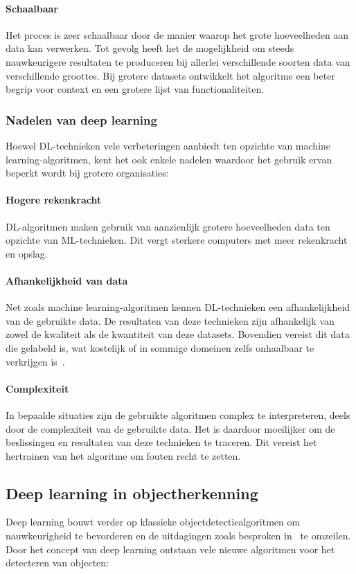 \paragraph{Schaalbaar}
Het proces is zeer schaalbaar door de manier waarop het grote hoeveelheden aan data kan verwerken.
Tot gevolg heeft het de mogelijkheid om steeds nauwkeurigere resultaten te produceren bij allerlei verschillende soorten data van verschillende groottes.
Bij grotere datasets ontwikkelt het algoritme een beter begrip voor context en een grotere lijst van functionaliteiten.

\subsubsection{Nadelen van deep learning}
Hoewel DL-technieken vele verbeteringen aanbiedt ten opzichte van machine learning-algoritmen, kent het ook enkele nadelen waardoor het gebruik ervan beperkt wordt bij grotere organisaties:

\paragraph{Hogere rekenkracht}
DL-algoritmen maken gebruik van aanzienlijk grotere hoeveelheden data ten opzichte van ML-technieken.
Dit vergt sterkere computers met meer rekenkracht en opslag.
\paragraph{Afhankelijkheid van data}
Net zoals machine learning-algoritmen kennen DL-technieken een afhankelijkheid van de gebruikte data.
De resultaten van deze technieken zijn afhankelijk van zowel de kwaliteit als de kwantiteit van deze datasets.
Bovendien vereist dit data die gelabeld is, wat kostelijk of in sommige domeinen zelfs onhaalbaar te verkrijgen is~\autocite{Olaoye2024a}.
\paragraph{Complexiteit}
In bepaalde situaties zijn de gebruikte algoritmen complex te interpreteren, deels door de complexiteit van de gebruikte data.
Het is daardoor moeilijker om de beslissingen en resultaten van deze technieken te traceren.
Dit vereist het hertrainen van het algoritme om fouten recht te zetten.

\subsection{Deep learning in objectherkenning}
\label{subsec:deep-learning-in-objectherkenning}
Deep learning bouwt verder op klassieke objectdetectiealgoritmen om nauwkeurigheid te bevorderen en de uitdagingen zoals besproken in~ te omzeilen.
Door het concept van deep learning ontstaan vele nieuwe algoritmen voor het detecteren van objecten:

